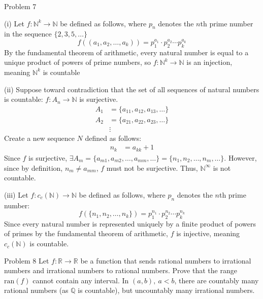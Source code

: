 \documentclass[10pt]{extarticle}
\begin{document}
{\begin{problem}{Problem 7}
\begin{problem}{(i)}
      Let $f: \mathbb{N}^k \rightarrow \mathbb{N}$ be defined as follows, where $p_n$ denotes the $n$th prime number in the sequence $\{2,3,5,\dots\}$
      \[
        f((a_1,a_2,\dots,a_k)) = p_1^{a_1}\cdot p_2^{a_2}\cdots p_k^{a_k}
      \] 
      By the fundamental theorem of arithmetic, every natural number is equal to a unique product of powers of prime numbers, so $f: \mathbb{N}^k \rightarrow \mathbb{N}$ is an injection, meaning $\mathbb{N}^k$ is countable
    \end{problem}
    \begin{problem}{(ii)}
      Suppose toward contradiction that the set of all sequences of natural numbers is countable: $f:A_n \rightarrow \mathbb{N}$ is surjective.
      \begin{align*}
        A_1 &= \{a_{11},a_{12},a_{13},\dots\}\\
        A_2 &= \{a_{21},a_{22},a_{23},\dots\}\\
            &\vdots
      \end{align*}
      Create a new sequence $N$ defined as follows:
      \begin{align*}
        n_{k} &= a_{kk} + 1
      \end{align*}
      Since $f$ is surjective, $\exists A_m = \{a_{m1},a_{m2},\dots,a_{mm},\dots\} = \{n_{1},n_{2},\dots,n_{m},\dots\}$. However, since by definition, $n_m \neq a_{mm}$, $f$ must not be surjective. Thus, $\mathbb{N}^{\infty}$ is not countable.
    \end{problem}
    \begin{problem}{(iii)}
      Let $f: c_c(\mathbb{N}) \rightarrow \mathbb{N}$ be defined as follows, where $p_n$ denotes the $n$th prime number:
      \[
        f(\{n_1,n_2,\dots,n_k\}) = p_1^{n_1}\cdot p_2^{n_2}\cdots p_{k}^{n_k}
      \] 
      Since every natural number is represented uniquely by a finite product of powers of primes by the fundamental theorem of arithmetic, $f$ is injective, meaning $c_c(\mathbb{N})$ is countable.
    \end{problem}
  \end{problem}
  \begin{problem}{Problem 8}
    Let $f:\mathbb{R} \rightarrow \mathbb{R}$ be a function that sends rational numbers to irrational numbers and irrational numbers to rational numbers. Prove that the range $\textrm{ran}(f)$ cannot contain any interval.
    \tcblower
    In $(a,b),~a<b$, there are countably many rational numbers (as $\mathbb{Q}$ is countable), but uncountably many irrational numbers.\\


\end{problem}}
\end{document}
